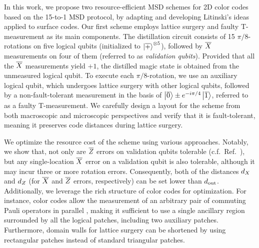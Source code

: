 \documentclass[
 prx,
 reprint,
 superscriptaddress,
 longbibliography,
 dvipsnames
]{revtex4-2}
\begin{document}
In this work, we propose two resource-efficient MSD schemes for 2D color codes based on the 15-to-1 MSD protocol, by adapting and developing Litinski's ideas applied to surface codes.
Our first scheme employs lattice surgery and faulty T-measurement as its main components. 
The distillation circuit consists of 15 $\pi/8$-rotations on five logical qubits (initialized to $\ket{\overline{+}}^{\otimes 5}$), followed by $\overline{X}$ measurements on four of them (referred to as \textit{validation qubits}). 
Provided that all the $\overline{X}$ measurements yield $+1$, the distilled magic state is obtained from the unmeasured logical qubit. 
To execute each $\pi/8$-rotation, we use an auxiliary logical qubit, which undergoes lattice surgery with other logical qubits, followed by a non-fault-tolerant measurement in the basis of ${\ket{\overline{0}} \pm e^{-i\pi/4}\ket{\overline{1}}}$, referred to as a faulty T-measurement. 
We carefully design a layout for the scheme from both macroscopic and microscopic perspectives and verify that it is fault-tolerant, meaning it preserves code distances during lattice surgery.

We optimize the resource cost of the scheme using various approaches. 
Notably, we show that, not only are $\overline{Z}$ errors on validation qubits tolerable (c.f.~Ref.~\cite{litinski2019magic}), but any single-location $\overline{X}$ error on a validation qubit is also tolerable, although it may incur three or more rotation errors. 
Consequently, both of the distances ${d_X}$ and ${d_Z}$ (for $\overline{X}$ and $\overline{Z}$ errors, respectively) can be set lower than $d_{\mathrm{out}}$.
Additionally, we leverage the rich structure of color codes for optimization. 
For instance, color codes allow the measurement of an arbitrary pair of commuting Pauli operators in parallel \cite{thomsen2024low}, making it sufficient to use a single ancillary region surrounded by all the logical patches, including two auxiliary patches. 
Furthermore, domain walls for lattice surgery can be shortened by using rectangular patches instead of standard triangular patches. 
\end{document}
